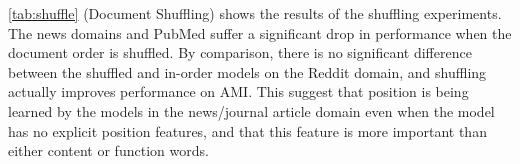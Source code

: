 \autoref{tab:shuffle} (Document Shuffling) shows the results
of the shuffling experiments. 
The news domains and PubMed suffer a significant drop in performance 
when the document order is shuffled. By comparison, there is no significant difference between the shuffled and in-order models on 
the Reddit domain, and shuffling actually improves performance on AMI.
This suggest that position 
is being learned by the models in the news/journal article domain even when 
the model has no explicit position features, and that this feature is more 
important than either content or function words.











